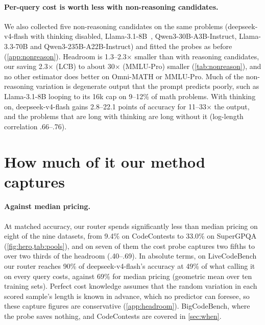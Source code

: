 \documentclass[10pt]{article}
\begin{document}
\paragraph{Per-query cost is worth less with non-reasoning candidates.}
We also collected five non-reasoning candidates on the same problems (deepseek-v4-flash with thinking disabled, Llama-3.1-8B~\citep{llama3}, Qwen3-30B-A3B-Instruct, Llama-3.3-70B and Qwen3-235B-A22B-Instruct) and fitted the probes as before (\cref{app:nonreason}). Headroom is 1.3--2.3$\times$ smaller than with reasoning candidates, our saving 2.3$\times$ (LCB) to about 30$\times$ (MMLU-Pro) smaller (\cref{tab:nonreason}), and no other estimator does better on Omni-MATH or MMLU-Pro. Much of the non-reasoning variation is degenerate output that the prompt predicts poorly, such as Llama-3.1-8B looping to its 16k cap on 9--12\% of math problems. With thinking on, deepseek-v4-flash gains 2.8--22.1 points of accuracy for 11--33$\times$ the output, and the problems that are long with thinking are long without it (log-length correlation .66--.76).

\section{How much of it our method captures}\label{sec:capture}
\paragraph{Against median pricing.}
At matched accuracy, our router spends significantly less than median pricing on eight of the nine datasets, from 9.4\% on CodeContests to 33.0\% on SuperGPQA (\cref{fig:hero,tab:pools}), and on seven of them the cost probe captures two fifths to over two thirds of the headroom (.40--.69). In absolute terms, on LiveCodeBench our router reaches 90\% of deepseek-v4-flash's accuracy at 49\% of what calling it on every query costs, against 69\% for median pricing (geometric mean over ten training sets). Perfect cost knowledge assumes that the random variation in each scored sample's length is known in advance, which no predictor can foresee, so these capture figures are conservative (\cref{app:headroom}). BigCodeBench, where the probe saves nothing, and CodeContests are covered in \cref{sec:when}.
\end{document}
